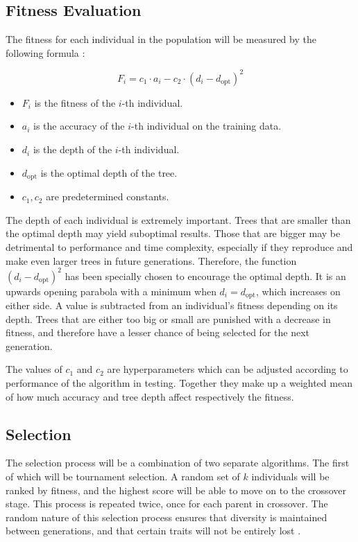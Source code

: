 \documentclass[12pt]{article}
\begin{document}
\subsection{Fitness Evaluation}

The fitness for each individual in the population will be measured by the following formula \cite{faik_2020}:

\[ F_i = c_1 \cdot a_i - c_2 \cdot (d_i - d_\text{opt})^2 \]

\begin{itemize}
    \item $F_i$ is the fitness of the $i$-th individual.
    \item $a_i$ is the accuracy of the $i$-th individual on the training data.
    \item $d_i$ is the depth of the $i$-th individual.
    \item $d_\text{opt}$ is the optimal depth of the tree.
    \item $c_1, c_2$ are predetermined constants.
\end{itemize}

The depth of each individual is extremely important. Trees that are smaller than the optimal depth may yield suboptimal results. Those that are bigger may be detrimental to performance and time complexity, especially if they reproduce and make even larger trees in future generations. Therefore, the function $(d_i - d_\text{opt})^2$ has been specially chosen to encourage the optimal depth. It is an upwards opening parabola with a minimum when $d_i = d_\text{opt}$, which increases on either side. A value is subtracted from an individual's fitness depending on its depth. Trees that are either too big or small are punished with a decrease in fitness, and therefore have a lesser chance of being selected for the next generation.

The values of $c_1$ and $c_2$ are hyperparameters which can be adjusted according to performance of the algorithm in testing. Together they make up a weighted mean of how much accuracy and tree depth affect respectively the fitness.

\subsection{Selection}

The selection process will be a combination of two separate algorithms. The first of which will be tournament selection. A random set of $k$ individuals will be ranked by fitness, and the highest score will be able to move on to the crossover stage. This process is repeated twice, once for each parent in crossover. The random nature of this selection process ensures that diversity is maintained between generations, and that certain traits will not be entirely lost \cite{blickle_1997}.
\end{document}
